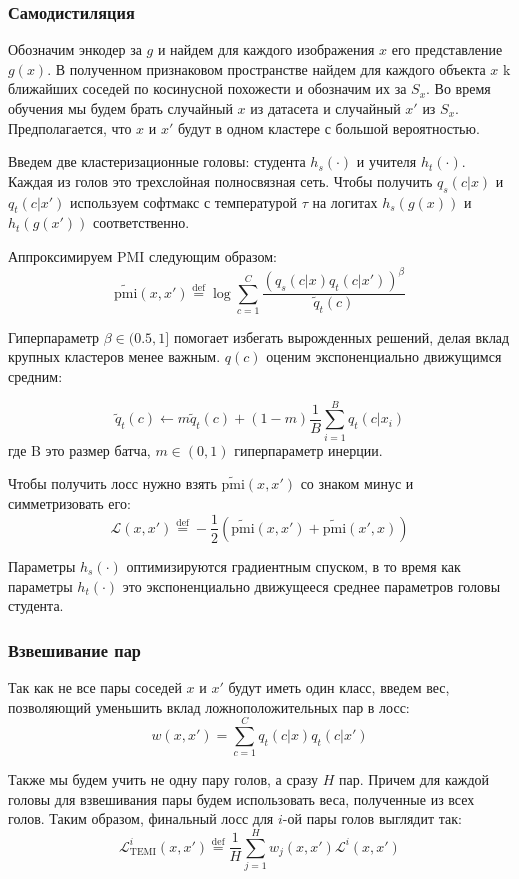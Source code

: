 \documentclass[a4paper,12pt]{extarticle}
\newcommand{\defeq}{\stackrel{\text{def}}{=}}
\begin{document}
\subsubsection{Самодистиляция}

Обозначим энкодер за $g$ и найдем для каждого изображения 
$x$ его представление $g(x)$. В полученном признаковом пространстве 
найдем для каждого объекта $x$ k ближайших соседей по косинусной похожести и
обозначим их за $S_x$. Во время обучения мы будем брать случайный 
$x$ из датасета и случайный $x'$ из $S_x$. Предполагается, что 
$x$ и $x'$ будут в одном кластере с большой вероятностью. 

Введем две кластеризационные головы: студента $h_s(\cdot)$
и учителя $h_t(\cdot)$. Каждая из голов это трехслойная 
полносвязная сеть. Чтобы получить $q_s(c|x)$ и $q_t(c|x')$ 
используем софтмакс с температурой $\tau$ на логитах 
$h_s(g(x))$ и $h_t(g(x'))$ соответственно. 

Аппроксимируем PMI следующим образом:
\[
	\widetilde{\text{pmi}}(x, x') \defeq \log 
	\sum_{c=1}^C \frac{(q_s(c|x)q_t(c|x'))^{\beta}}{\tilde{q}_t(c)}
\]

Гиперпараметр $\beta\in(0.5, 1]$ помогает 
избегать вырожденных решений, делая вклад крупных кластеров 
менее важным. $q(c)$ оценим экспоненциально движущимся средним:

\[
	\tilde{q}_t(c)\leftarrow m \tilde{q}_t(c) + 
	(1-m)\frac{1}{B}\sum_{i=1}^B q_t(c|x_i)
\]
где B это размер батча, $m\in(0, 1)$ гиперпараметр инерции.

Чтобы получить лосс нужно взять $\widetilde{\text{pmi}}(x, x')$ 
со знаком минус и симметризовать его:
\[
	\mathcal{L}(x, x') \defeq 
	-\frac{1}{2}\left(\widetilde{\text{pmi}}(x, x') 
	+\widetilde{\text{pmi}}(x', x)\right)
\]

Параметры $h_s(\cdot)$ оптимизируются градиентным спуском, 
в то время как параметры $h_t(\cdot)$ это экспоненциально 
движущееся среднее параметров головы студента.  

\subsubsection{Взвешивание пар}

Так как не все пары соседей $x$ и $x'$ будут иметь 
один класс, введем вес, позволяющий уменьшить вклад 
ложноположительных пар в лосс:
\[
	w(x, x')=\sum_{c=1}^C q_t(c|x)q_t(c|x')
\]

Также мы будем учить не одну пару голов, а сразу 
$H$ пар. Причем для каждой головы для взвешивания 
пары будем использовать веса, полученные из всех голов. 
Таким образом, финальный лосс для $i$-ой пары голов выглядит 
так:
\[
	\mathcal{L}_{\text{TEMI}}^i(x, x')\defeq 
	\frac{1}{H}\sum_{j=1}^H w_j(x, x')\mathcal{L}^i(x, x')
\]
\end{document}

